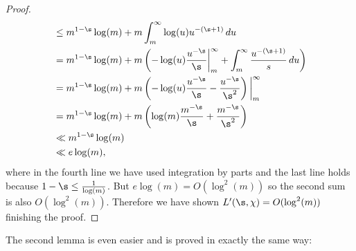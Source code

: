 \begin{proof}
\begin{align*}
          &\le m^{1-\s}\log(m)+m\int_{m}^{\infty}\log(u)u^{-(\s+1)}\,du \\
          &= m^{1-\s}\log(m)+m\left(-\log(u)\frac{u^{-\s}}{\s}\bigg|_{m}^{\infty}+\int_{m}^{\infty}\frac{u^{-(\s+1)}}{s}\,du\right) \\
          &= m^{1-\s}\log(m)+m\left(-\log(u)\frac{u^{-\s}}{\s}-\frac{u^{-\s}}{\s^{2}}\right)\bigg|_{m}^{\infty} \\
          &= m^{1-\s}\log(m)+m\left(\log(m)\frac{m^{-\s}}{\s}+\frac{m^{-\s}}{\s^{2}}\right) \\
          &\ll m^{1-\s}\log(m) \\
          &\ll e\log(m),
        \end{align*}
        where in the fourth line we have used integration by parts and the last line holds because $1-\s \le \frac{1}{\log(m)}$. But $e\log(m) = O(\log^{2}(m))$ so the second sum is also $O(\log^{2}(m))$. Therefore we have shown $L'(\s,\chi) = O(\log^{2}(m))$ finishing the proof. 
      \end{proof}

      The second lemma is even easier and is proved in exactly the same way:

